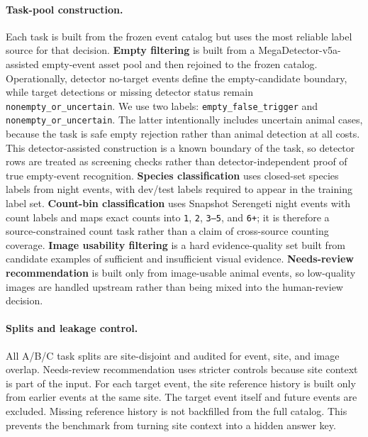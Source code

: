 \documentclass{article}
\begin{document}
\paragraph{Task-pool construction.}
Each task is built from the frozen event catalog but uses the most reliable label source for that decision. \textbf{Empty filtering} is built from a MegaDetector-v5a-assisted empty-event asset pool and then rejoined to the frozen catalog. Operationally, detector no-target events define the empty-candidate boundary, while target detections or missing detector status remain \texttt{nonempty\_or\_uncertain}. We use two labels: \texttt{empty\_false\_trigger} and \texttt{nonempty\_or\_uncertain}. The latter intentionally includes uncertain animal cases, because the task is safe empty rejection rather than animal detection at all costs. This detector-assisted construction is a known boundary of the task, so detector rows are treated as screening checks rather than detector-independent proof of true empty-event recognition. \textbf{Species classification} uses closed-set species labels from night events, with dev/test labels required to appear in the training label set. \textbf{Count-bin classification} uses Snapshot Serengeti night events with count labels and maps exact counts into \texttt{1}, \texttt{2}, \texttt{3--5}, and \texttt{6+}; it is therefore a source-constrained count task rather than a claim of cross-source counting coverage. \textbf{Image usability filtering} is a hard evidence-quality set built from candidate examples of sufficient and insufficient visual evidence. \textbf{Needs-review recommendation} is built only from image-usable animal events, so low-quality images are handled upstream rather than being mixed into the human-review decision.

\paragraph{Splits and leakage control.}
All A/B/C task splits are site-disjoint and audited for event, site, and image overlap. Needs-review recommendation uses stricter controls because site context is part of the input. For each target event, the site reference history is built only from earlier events at the same site. The target event itself and future events are excluded. Missing reference history is not backfilled from the full catalog. This prevents the benchmark from turning site context into a hidden answer key.
\end{document}
